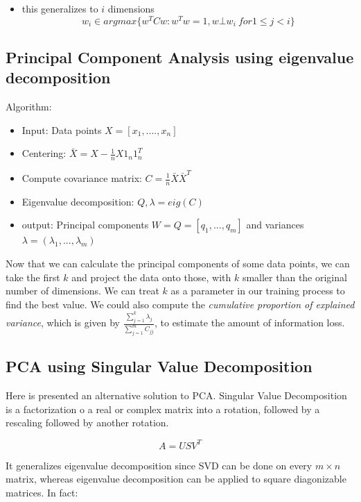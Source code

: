 \documentclass{article}
\begin{document}
\begin{itemize}
\tightlist
\item
  this generalizes to \(i\) dimensions
  \[w_i \in argmax \{ w^T C w: w^T w =1, w \bot w_i\ for 1 \le j < i \}\]
\end{itemize}

\subsection{Principal Component Analysis using eigenvalue
decomposition}\label{principal-component-analysis-using-eigenvalue-decomposition}

Algorithm:

\begin{itemize}
\tightlist
\item
  Input: Data points \(X=[x_1, ...., x_n]\)
\item
  Centering: \(\bar X = X - \frac{1}{n}X1_n1_n^T\)
\item
  Compute covariance matrix: \(C=\frac{1}{n}\bar X \bar X^T\)
\item
  Eigenvalue decomposition: \(Q, \lambda = eig(C)\)
\item
  output: Principal components \(W = Q = [q_1, ..., q_m]\) and variances
  \(\lambda = (\lambda _1, ..., \lambda _m)\)
\end{itemize}

Now that we can calculate the principal components of some data points,
we can take the first \(k\) and project the data onto those, with \(k\)
smaller than the original number of dimensions. We can treat \(k\) as a
parameter in our training process to find the best value. We could also
compute the \emph{cumulative proportion of explained variance}, which is
given by \(\frac{\sum_{j=1}^k \lambda_j}{\sum_{j=1}^m C_{jj}}\), to
estimate the amount of information loss.

\subsection{PCA using Singular Value
Decomposition}\label{pca-using-singular-value-decomposition}

Here is presented an alternative solution to PCA. Singular Value
Decomposition is a factorization o a real or complex matrix into a
rotation, followed by a rescaling followed by another rotation.

\[A = USV^T\]

It generalizes eigenvalue decomposition since SVD can be done on every
\(m\times n\) matrix, whereas eigenvalue decomposition can be applied to
square diagonizable matrices. In fact:
\end{document}
